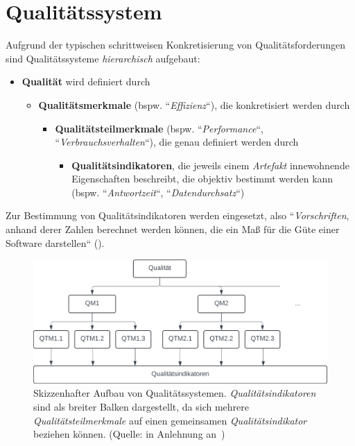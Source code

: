 \section{Qualitätssystem}

\begin{tcolorbox}[title=Qualitätssystem]
    Aufgrund der typischen schrittweisen Konkretisierung von Qualitätsforderungen sind Qualitätssysteme  \textit{hierarchisch} aufgebaut:

    \begin{itemize}
        \item \textbf{Qualität} wird definiert durch
        \begin{itemize}
            \item  \textbf{Qualitätsmerkmale} (bspw. ``\textit{Effizienz}``), die konkretisiert werden durch
            \begin{itemize}
                \item  \textbf{Qualitätsteilmerkmale} (bspw. ``\textit{Performance}``, ``\textit{Verbrauchsverhalten}``), die genau definiert werden durch
                \begin{itemize}
                    \item \textbf{Qualitätsindikatoren}, die jeweils einem \textit{Artefakt} innewohnende Eigenschaften beschreibt, die objektiv bestimmt werden kann (bspw. ``\textit{Antwortzeit}``, ``\textit{Datendurchsatz}``)
                \end{itemize}
            \end{itemize}
        \end{itemize}
    \end{itemize}

    \noindent
    Zur Bestimmung von Qualitätsindikatoren werden  eingesetzt, also ``\textit{Vorschriften}, anhand derer Zahlen berechnet werden können, die ein Maß für die Güte einer Software darstellen`` (\cite[3, Hervorhebung eigene]{Wed09c}).
\end{tcolorbox}


\begin{figure}
    \centering
    \includegraphics[scale=0.8]{part four/Qualität/img/qualitätssysteme}
    \caption{Skizzenhafter Aufbau von Qualitätssystemen. \textit{Qualitätsindikatoren} sind als breiter Balken dargestellt, da sich mehrere \textit{Qualitätsteilmerkmale} auf einen gemeinsamen \textit{Qualitätsindikator} beziehen können. (Quelle: in Anlehnung an~\cite[Abb. 1.1, 3]{Wed09c})}
    \label{fig:qualitätssysteme-cc}
\end{figure}